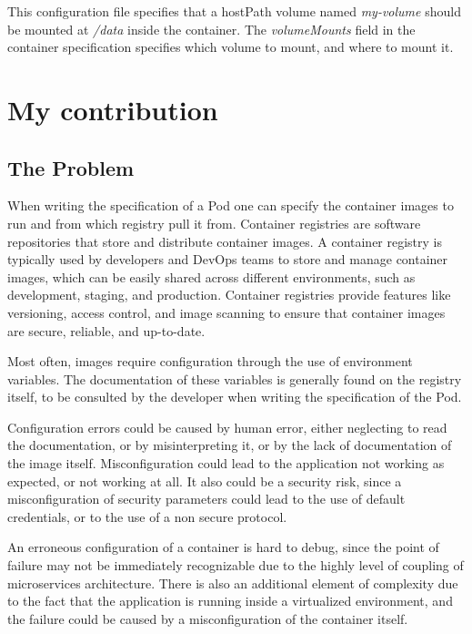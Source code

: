 \documentclass[
  11pt,
]{article}
\begin{document}
This configuration file specifies that a hostPath volume named
\emph{my-volume} should be mounted at \emph{/data }inside the container.
The \emph{volumeMounts} field in the container specification specifies
which volume to mount, and where to mount it.

\hypertarget{my-contribution}{%
\section{My contribution}\label{my-contribution}}

\hypertarget{the-problem}{%
\subsection{The Problem}\label{the-problem}}

When writing the specification of a Pod one can specify the container
images to run and from which registry pull it from. Container registries
are software repositories that store and distribute container images. A
container registry is typically used by developers and DevOps teams to
store and manage container images, which can be easily shared across
different environments, such as development, staging, and production.
Container registries provide features like versioning, access control,
and image scanning to ensure that container images are secure, reliable,
and up-to-date.

Most often, images require configuration through the use of environment
variables. The documentation of these variables is generally found on
the registry itself, to be consulted by the developer when writing the
specification of the Pod.

Configuration errors could be caused by human error, either neglecting
to read the documentation, or by misinterpreting it, or by the lack of
documentation of the image itself. Misconfiguration could lead to the
application not working as expected, or not working at all. It also
could be a security risk, since a misconfiguration of security
parameters could lead to the use of default credentials, or to the use
of a non secure protocol.

An erroneous configuration of a container is hard to debug, since the
point of failure may not be immediately recognizable due to the highly
level of coupling of microservices architecture. There is also an
additional element of complexity due to the fact that the application is
running inside a virtualized environment, and the failure could be
caused by a misconfiguration of the container itself.
\end{document}
